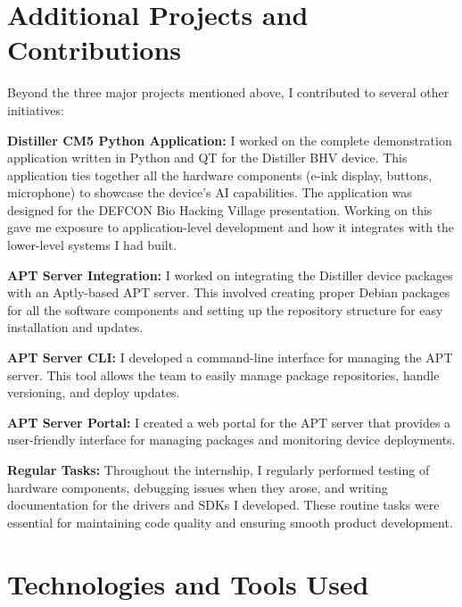 \documentclass[12pt,a4paper]{report}
\begin{document}
\section{Additional Projects and Contributions}

Beyond the three major projects mentioned above, I contributed to several other initiatives:

\vspace{0.3cm}

\textbf{Distiller CM5 Python Application:} I worked on the complete demonstration application written in Python and QT for the Distiller BHV device. This application ties together all the hardware components (e-ink display, buttons, microphone) to showcase the device's AI capabilities. The application was designed for the DEFCON Bio Hacking Village presentation. Working on this gave me exposure to application-level development and how it integrates with the lower-level systems I had built.

\vspace{0.3cm}

\textbf{APT Server Integration:} I worked on integrating the Distiller device packages with an Aptly-based APT server. This involved creating proper Debian packages for all the software components and setting up the repository structure for easy installation and updates.

\vspace{0.3cm}

\textbf{APT Server CLI:} I developed a command-line interface for managing the APT server. This tool allows the team to easily manage package repositories, handle versioning, and deploy updates.

\vspace{0.3cm}

\textbf{APT Server Portal:} I created a web portal for the APT server that provides a user-friendly interface for managing packages and monitoring device deployments.

\vspace{0.3cm}

\textbf{Regular Tasks:} Throughout the internship, I regularly performed testing of hardware components, debugging issues when they arose, and writing documentation for the drivers and SDKs I developed. These routine tasks were essential for maintaining code quality and ensuring smooth product development.

\section{Technologies and Tools Used}
\end{document}
